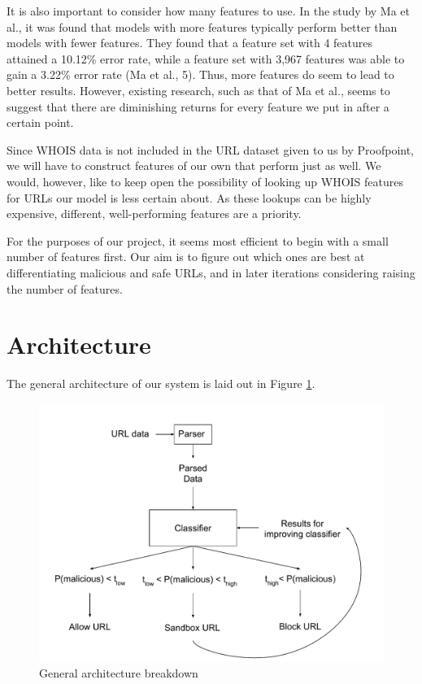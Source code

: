 \documentclass[cs,proposal]{hmcclinic}
\begin{document}
It is also important to consider how many features to use. In the study by Ma et al., it was found that models with more features typically perform better than models with fewer features. They found that a feature set with 4 features attained a 10.12\% error rate, while a feature set with 3,967 features was able to gain a 3.22\% error rate (Ma et al., 5). Thus, more features do seem to lead to better results. However, existing research, such as that of Ma et al., seems to suggest that there are diminishing returns for every feature we put in after a certain point.

Since WHOIS data is not included in the URL dataset given to us by Proofpoint, we will have to construct features of our own that perform just as well. We would, however, like to keep open the possibility of looking up WHOIS features for URLs our model is less certain about. As these lookups can be highly expensive, different, well-performing features are a priority.

For the purposes of our project, it seems most efficient to begin with a small number of features first. Our aim is to figure out which ones are best at differentiating malicious and safe URLs, and in later iterations considering raising the number of features.


\section{Architecture}

The general architecture of our system is laid out in Figure \ref{architecture-fig}.

\begin{figure}[ht]
  \centering
    \includegraphics[scale=0.75]{architecture_diagram}
  \caption{General architecture breakdown}
  \label{architecture-fig}
\end{figure}
\end{document}
